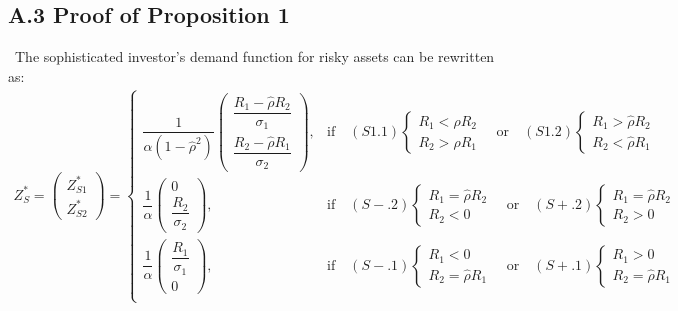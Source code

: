 \documentclass[10pt]{article}
\begin{document}

\subsection*{A.3 \quad Proof of Proposition 1}

\quad \
The sophisticated investor's demand function for risky assets can be rewritten as:
{\small \begin{eqnarray}
Z_S^* = \left( \begin{matrix} Z_{S 1}^* \\ Z_{S 2}^* \end{matrix} \right) = \left\{ \begin{matrix}
\dfrac1{\alpha (1 - {\hat \rho}^2)} \left( \begin{matrix} \dfrac{R_1 - {\hat \rho} R_2}{\sigma_1} \\ \dfrac{R_2 - {\hat \rho} R_1}{\sigma_2} \end{matrix} \right), & \text{if} \quad (S1.1) \left\{ \begin{matrix} R_1 < {\hat \rho} R_2 \\ R_2 > {\hat \rho} R_1 \end{matrix} \right. \quad \text{or} \quad (S1.2) \left\{ \begin{matrix} R_1 > {\hat \rho} R_2 \\ R_2 < {\hat \rho} R_1 \end{matrix} \right. \\
\dfrac1{\alpha} \left( \begin{matrix} 0 \\ \dfrac{R_2}{\sigma_2} \end{matrix} \right), & \text{if} \quad (S-.2) \left\{ \begin{matrix} R_1 = {\hat \rho} R_2 \\ R_2 < 0 \end{matrix} \right. \quad \text{or} \quad (S+.2) \left\{ \begin{matrix} R_1 = {\hat \rho} R_2 \\ R_2 > 0 \end{matrix} \right. \\
\dfrac1{\alpha} \left( \begin{matrix} \dfrac{R_1}{\sigma_1} \\ 0 \end{matrix} \right), & \text{if} \quad (S-.1) \left\{ \begin{matrix} R_1 < 0 \\ R_2 = {\hat \rho} R_1 \end{matrix} \right. \quad \text{or} \quad (S+.1) \left\{ \begin{matrix} R_1 > 0 \\ R_2 = {\hat \rho} R_1 \end{matrix} \right. \\

\end{matrix}
\end{eqnarray}}
\end{document}

